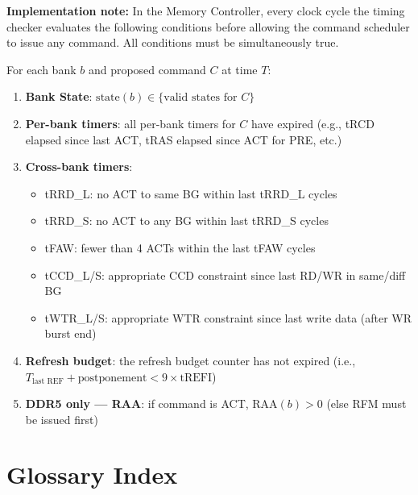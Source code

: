 \documentclass[11pt,a4paper]{article}
\begin{document}
\begin{notebox}
\textbf{Implementation note:} In the Memory Controller, every clock cycle the timing
checker evaluates the following conditions before allowing the command scheduler to 
issue any command. All conditions must be simultaneously true.
\end{notebox}

For each bank $b$ and proposed command $C$ at time $T$:

\begin{enumerate}[leftmargin=1.5em, itemsep=2pt]
  \item \textbf{Bank State}: $\text{state}(b) \in \{\text{valid states for } C\}$
  \item \textbf{Per-bank timers}: all per-bank timers for $C$ have expired
        (e.g., tRCD elapsed since last ACT, tRAS elapsed since ACT for PRE, etc.)
  \item \textbf{Cross-bank timers}:
    \begin{itemize}
      \item tRRD\_L: no ACT to same BG within last tRRD\_L cycles
      \item tRRD\_S: no ACT to any BG within last tRRD\_S cycles  
      \item tFAW: fewer than 4 ACTs within the last tFAW cycles
      \item tCCD\_L/S: appropriate CCD constraint since last RD/WR in same/diff BG
      \item tWTR\_L/S: appropriate WTR constraint since last write data (after WR burst end)
    \end{itemize}
  \item \textbf{Refresh budget}: the refresh budget counter has not expired
        (i.e., $T_{\text{last REF}} + \text{postponement} < 9 \times \text{tREFI}$)
  \item \textbf{DDR5 only — RAA}: if command is ACT, $\text{RAA}(b) > 0$ (else RFM must be issued first)
\end{enumerate}

\section{Glossary Index}
\end{document}

